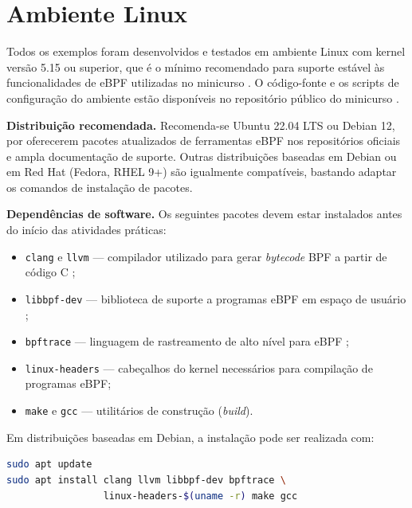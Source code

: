 \section{Ambiente Linux}

Todos os exemplos foram desenvolvidos e testados em ambiente Linux com kernel
versão 5.15 ou superior, que é o mínimo recomendado para suporte estável às
funcionalidades de eBPF utilizadas no minicurso \cite{linuxkernel2024}.
O código-fonte e os scripts de configuração do ambiente estão disponíveis no
repositório público do minicurso \cite{plinta2026repo}.

\textbf{Distribuição recomendada.}
Recomenda-se Ubuntu 22.04 LTS ou Debian 12, por oferecerem pacotes atualizados de
ferramentas eBPF nos repositórios oficiais e ampla documentação de suporte.
Outras distribuições baseadas em Debian ou em Red Hat (Fedora, RHEL 9+) são
igualmente compatíveis, bastando adaptar os comandos de instalação de pacotes.

\textbf{Dependências de software.}
Os seguintes pacotes devem estar instalados antes do início das atividades práticas:

\begin{itemize}
  \item \texttt{clang} e \texttt{llvm} — compilador utilizado para gerar
        \textit{bytecode} BPF a partir de código C \cite{linuxkernel2024};
  \item \texttt{libbpf-dev} — biblioteca de suporte a programas eBPF em espaço
        de usuário \cite{libbpf};
  \item \texttt{bpftrace} — linguagem de rastreamento de alto nível para eBPF
        \cite{bpftrace};
  \item \texttt{linux-headers} — cabeçalhos do kernel necessários para compilação
        de programas eBPF;
  \item \texttt{make} e \texttt{gcc} — utilitários de construção (\textit{build}).
\end{itemize}

Em distribuições baseadas em Debian, a instalação pode ser realizada com:

\begin{lstlisting}[language=bash]
sudo apt update
sudo apt install clang llvm libbpf-dev bpftrace \
                 linux-headers-$(uname -r) make gcc
\end{lstlisting}

